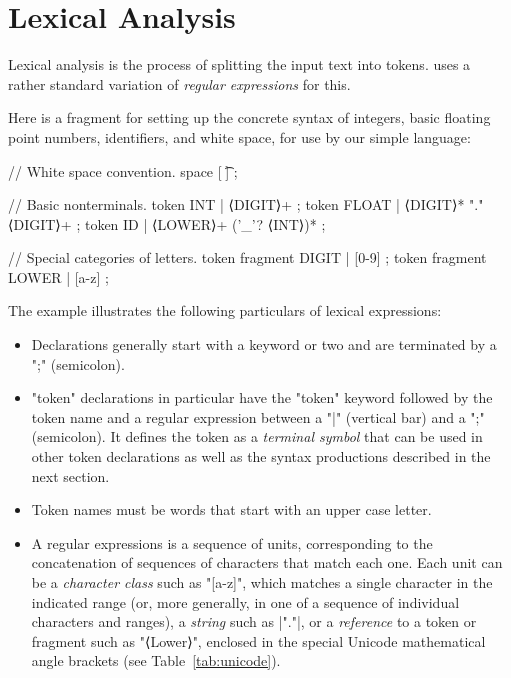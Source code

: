 \documentclass[11pt]{article} %
\begin{document}
\section{Lexical Analysis}
\label{sec:tokens}

Lexical analysis is the process of splitting the input text into tokens. \HAX uses a rather standard
variation of \emph{regular expressions} for this.

\begin{example}\label{ex:lexical}
  Here is a \HAX fragment for setting up the concrete syntax of integers, basic floating point
  numbers, identifiers, and white space, for use by our simple language:
\begin{hacs}[xleftmargin=\parindent,numbers=right,texcl]
// White space convention.
space [ \t\n] ;

// Basic nonterminals.
token INT      | ⟨DIGIT⟩+ ;
token FLOAT    | ⟨DIGIT⟩* "." ⟨DIGIT⟩+ ;
token ID       | ⟨LOWER⟩+ ('_'? ⟨INT⟩)* ;

// Special categories of letters.
token fragment DIGIT  | [0-9] ;
token fragment LOWER  | [a-z] ;
\end{hacs}
  The example illustrates the following particulars of \HAX lexical expressions:
  \begin{itemize}

  \item Declarations generally start with a keyword or two and are terminated by a ";" (semicolon).

  \item "token" declarations in particular have the "token" keyword followed by the token name and a
    regular expression between a "|" (vertical bar) and a ";" (semicolon). It defines the token as a
    \emph{terminal symbol} that can be used in other token declarations as well as the syntax
    productions described in the next section.

  \item Token names must be words that start with an upper case letter.

  \item A regular expressions is a sequence of units, corresponding to the concatenation of
    sequences of characters that match each one.  Each unit can be a \emph{character class} such as
    "[a-z]", which matches a single character in the indicated range (or, more generally, in one of
    a sequence of individual characters and ranges), a \emph{string} such as \hacsc|"."|, or a
    \emph{reference} to a token or fragment such as "⟨Lower⟩", enclosed in the special Unicode
    mathematical angle brackets (see Table~\ref{tab:unicode}).


\end{itemize}
\end{example}
\end{document}
